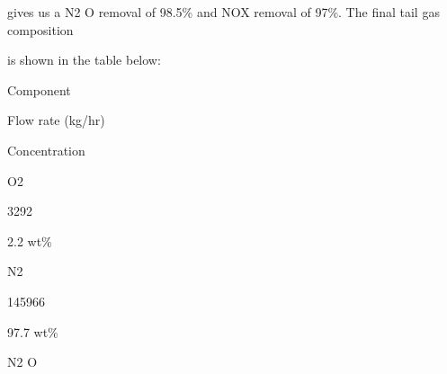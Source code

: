 \documentclass[a4paper,portrait,12pt]{article}
\begin{document}
\begin{flushleft}
gives us a N2 O removal of 98.5\% and NOX removal of 97\%. The final tail gas composition
\end{flushleft}


\begin{flushleft}
is shown in the table below:
\end{flushleft}


\begin{flushleft}
Component
\end{flushleft}





\begin{flushleft}
Flow rate (kg/hr)
\end{flushleft}





\begin{flushleft}
Concentration
\end{flushleft}





\begin{flushleft}
O2
\end{flushleft}





3292





\begin{flushleft}
2.2 wt\%
\end{flushleft}





\begin{flushleft}
N2
\end{flushleft}





145966





\begin{flushleft}
97.7 wt\%
\end{flushleft}





\begin{flushleft}
N2 O
\end{flushleft}
\end{document}
